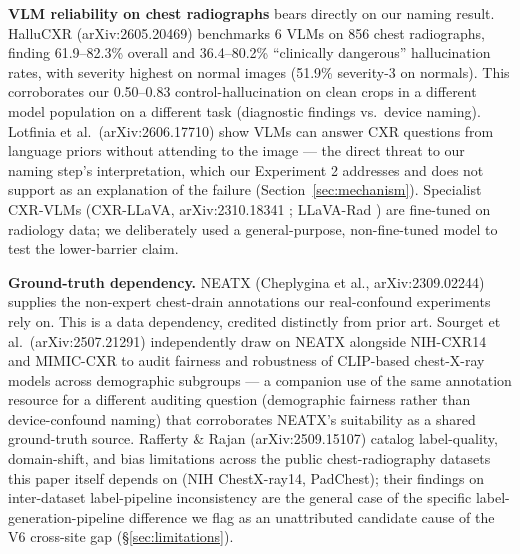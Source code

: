 \documentclass{ieeeaccess}
\begin{document}
\textbf{VLM reliability on chest radiographs} bears directly on our naming result. HalluCXR (arXiv:2605.20469) \cite{hallucxr} benchmarks 6 VLMs on 856 chest radiographs, finding 61.9--82.3\% overall and 36.4--80.2\% ``clinically dangerous'' hallucination rates, with severity highest on normal images (51.9\% severity-3 on normals). This corroborates our 0.50--0.83 control-hallucination on clean crops in a different model population on a different task (diagnostic findings vs.\ device naming). Lotfinia et al.\ (arXiv:2606.17710) \cite{lotfinia2026} show VLMs can answer CXR questions from language priors without attending to the image --- the direct threat to our naming step's interpretation, which our Experiment 2 addresses and does not support as an explanation of the failure (Section~\ref{sec:mechanism}). Specialist CXR-VLMs (CXR-LLaVA, arXiv:2310.18341 \cite{cxrllava}; LLaVA-Rad \cite{llavarad}) are fine-tuned on radiology data; we deliberately used a general-purpose, non-fine-tuned model to test the lower-barrier claim.

\textbf{Ground-truth dependency.} NEATX (Cheplygina et al., arXiv:2309.02244) \cite{neatx} supplies the non-expert chest-drain annotations our real-confound experiments rely on. This is a data dependency, credited distinctly from prior art. Sourget et al.\ (arXiv:2507.21291) \cite{sourget2025} independently draw on NEATX alongside NIH-CXR14 and MIMIC-CXR to audit fairness and robustness of CLIP-based chest-X-ray models across demographic subgroups --- a companion use of the same annotation resource for a different auditing question (demographic fairness rather than device-confound naming) that corroborates NEATX's suitability as a shared ground-truth source. Rafferty \& Rajan (arXiv:2509.15107) \cite{rafferty2026} catalog label-quality, domain-shift, and bias limitations across the public chest-radiography datasets this paper itself depends on (NIH ChestX-ray14, PadChest); their findings on inter-dataset label-pipeline inconsistency are the general case of the specific label-generation-pipeline difference we flag as an unattributed candidate cause of the V6 cross-site gap (\S\ref{sec:limitations}).
\end{document}
